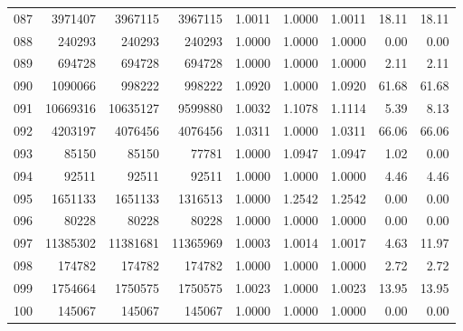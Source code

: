 \begin{longtable}{crrrrrrrr}
087 & 3971407 & 3967115 & 3967115 & 1.0011 & 1.0000 & 1.0011 & 18.11 & 18.11 \\
088 & 240293 & 240293 & 240293 & 1.0000 & 1.0000 & 1.0000 & 0.00 & 0.00 \\
089 & 694728 & 694728 & 694728 & 1.0000 & 1.0000 & 1.0000 & 2.11 & 2.11 \\
090 & 1090066 & 998222 & 998222 & 1.0920 & 1.0000 & 1.0920 & 61.68 & 61.68 \\
091 & 10669316 & 10635127 & 9599880 & 1.0032 & 1.1078 & 1.1114 & 5.39 & 8.13 \\
092 & 4203197 & 4076456 & 4076456 & 1.0311 & 1.0000 & 1.0311 & 66.06 & 66.06 \\
093 & 85150 & 85150 & 77781 & 1.0000 & 1.0947 & 1.0947 & 1.02 & 0.00 \\
094 & 92511 & 92511 & 92511 & 1.0000 & 1.0000 & 1.0000 & 4.46 & 4.46 \\
095 & 1651133 & 1651133 & 1316513 & 1.0000 & 1.2542 & 1.2542 & 0.00 & 0.00 \\
096 & 80228 & 80228 & 80228 & 1.0000 & 1.0000 & 1.0000 & 0.00 & 0.00 \\
097 & 11385302 & 11381681 & 11365969 & 1.0003 & 1.0014 & 1.0017 & 4.63 & 11.97 \\
098 & 174782 & 174782 & 174782 & 1.0000 & 1.0000 & 1.0000 & 2.72 & 2.72 \\
099 & 1754664 & 1750575 & 1750575 & 1.0023 & 1.0000 & 1.0023 & 13.95 & 13.95 \\
100 & 145067 & 145067 & 145067 & 1.0000 & 1.0000 & 1.0000 & 0.00 & 0.00 \\
\end{longtable}

